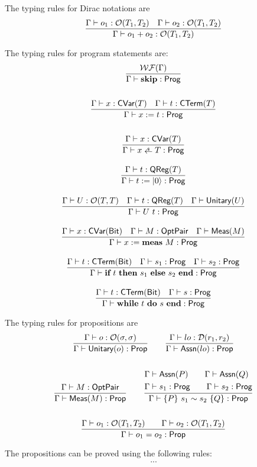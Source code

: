 The typing rules for Dirac notations are
\begin{gather*}
    \frac{\Gamma \vdash o_1 : \mathcal{O}(T_1, T_2) \quad \Gamma \vdash o_2 : \mathcal{O}(T_1, T_2)}{\Gamma \vdash o_1 + o_2 : \mathcal{O}(T_1, T_2)}
\end{gather*}


The typing rules for program statements are:
\begin{gather*}
    \frac{\WF{\Gamma}}{\Gamma \vdash \Skip : \prog} \\
    \\
    \frac{\Gamma \vdash x : \cvar{T} \quad \Gamma \vdash t : \CTerm{T}}{\Gamma \vdash \Assign{x}{t} : \prog} \\
    \\
    \frac{\Gamma \vdash x : \cvar{T}}{\Gamma \vdash \pAssign{x}{T} : \prog} \\
    \\
    \frac{\Gamma \vdash t : \qreg{T}}{\Gamma \vdash \Init{t} : \prog} \\
    \\
    \frac{\Gamma \vdash U : \opt{T}{T} \quad \Gamma \vdash t : \qreg{T} \quad \Gamma \vdash \unitary{U}}{\Gamma \vdash U\ t : \prog} \\
    \\
    \frac{\Gamma \vdash x : \cvar{\bit} \quad \Gamma \vdash M : \optpair \quad \Gamma \vdash \meas{M}}{\Gamma \vdash \MeaAssign{x}{M} : \prog} \\
    \\
    \frac{\Gamma \vdash t : \CTerm{\bit} \quad \Gamma \vdash s_1 : \prog \quad \Gamma \vdash s_2 : \prog}
    {\Gamma \vdash \If{t}{s_1}{s_2} : \prog} \\
    \\
    \frac{\Gamma \vdash t : \CTerm{\bit} \quad \Gamma \vdash s : \prog}
    {\Gamma \vdash \While{t}{s} : \prog}
\end{gather*}



The typing rules for propositions are
\begin{gather*}
    \frac{\Gamma \vdash o : \mathcal{O}(\sigma, \sigma)}{\Gamma \vdash \textsf{Unitary}({o}) : \textsf{Prop}}
    \qquad
    \frac{\Gamma \vdash lo : \mathcal{D}(r_1, r_2)}{\Gamma \vdash \textsf{Assn}(lo) : \textsf{Prop}} \\
    \\
    \frac{\Gamma \vdash M : \textsf{OptPair}}{\Gamma \vdash \textsf{Meas}(M) : \textsf{Prop}}
    \qquad
    \frac{
        \begin{aligned}
            & \Gamma \vdash \textsf{Assn}(P) \qquad \Gamma \vdash \textsf{Assn}(Q) \\
            & \Gamma \vdash s_1 : \textsf{Prog} \qquad \Gamma \vdash s_2 : \textsf{Prog}
        \end{aligned}}
        {
            \Gamma \vdash \{P\}~s_1 \sim s_2~\{Q\} : \textsf{Prop}
        } \\
    \\
    \frac{\Gamma \vdash o_1 : \mathcal{O}(T_1, T_2) \qquad \Gamma \vdash o_2 : \mathcal{O}(T_1, T_2)}{\Gamma \vdash o_1 = o_2 : \textsf{Prop}}
\end{gather*}


The propositions can be proved using the following rules:
\begin{gather*}
    ...
\end{gather*}